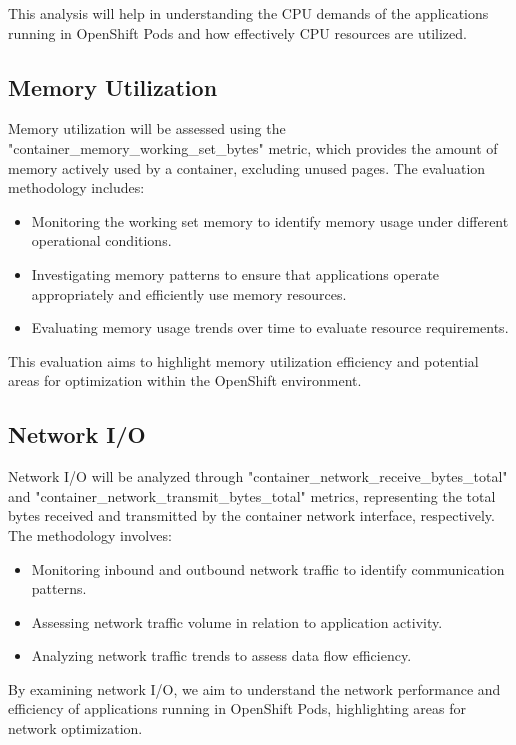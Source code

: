 This analysis will help in understanding the \ac{CPU} demands of the applications running in OpenShift Pods and how effectively \ac{CPU} resources are utilized.

\subsection{Memory Utilization}

Memory utilization will be assessed using the "container\_memory\_working\_set\_bytes" metric, which provides the amount of memory actively used by a container, excluding unused pages. The evaluation methodology includes:

\begin{itemize}
    \item Monitoring the working set memory to identify memory usage under different operational conditions.
    \item Investigating memory patterns to ensure that applications operate appropriately and efficiently use memory resources.
    \item Evaluating memory usage trends over time to evaluate resource requirements. 
\end{itemize}

This evaluation aims to highlight memory utilization efficiency and potential areas for optimization within the OpenShift environment.

\subsection{Network I/O}

Network I/O will be analyzed through "container\_network\_receive\_bytes\_total" and "container\_network\_transmit\_bytes\_total" metrics, representing the total bytes received and transmitted by the container network interface, respectively. The methodology involves:

\begin{itemize}
    \item Monitoring inbound and outbound network traffic to identify communication patterns.
    \item Assessing network traffic volume in relation to application activity.
    \item Analyzing network traffic trends to assess data flow efficiency.
\end{itemize}

By examining network I/O, we aim to understand the network performance and efficiency of applications running in OpenShift Pods, highlighting areas for network optimization.

